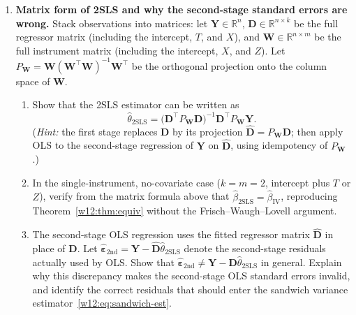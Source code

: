 \documentclass[master.tex]{subfiles}
\begin{document}
\begin{enumerate}
\item \textbf{Matrix form of 2SLS and why the second-stage standard
  errors are wrong.}
  Stack observations into matrices: let $\mathbf{Y} \in \mathbb{R}^n$,
  $\mathbf{D} \in \mathbb{R}^{n \times k}$ be the full regressor
  matrix (including the intercept, $T$, and $X$), and
  $\mathbf{W} \in \mathbb{R}^{n \times m}$ be the full instrument
  matrix (including the intercept, $X$, and $Z$).  Let
  $P_{\mathbf{W}} = \mathbf{W}(\mathbf{W}^\top\mathbf{W})^{-1}\mathbf{W}^\top$
  be the orthogonal projection onto the column space of $\mathbf{W}$.
  \begin{enumerate}
    \item Show that the 2SLS estimator can be written as
      \[
        \hat\theta_{\mathrm{2SLS}}
        = \bigl(\mathbf{D}^\top P_{\mathbf{W}}\mathbf{D}\bigr)^{-1}
          \mathbf{D}^\top P_{\mathbf{W}}\mathbf{Y}.
      \]
      (\emph{Hint:} the first stage replaces $\mathbf{D}$ by its
      projection $\hat{\mathbf{D}} = P_{\mathbf{W}}\mathbf{D}$; then
      apply OLS to the second-stage regression of $\mathbf{Y}$ on
      $\hat{\mathbf{D}}$, using idempotency of $P_{\mathbf{W}}$.)
    \item In the single-instrument, no-covariate case ($k = m = 2$,
      intercept plus $T$ or $Z$), verify from the matrix formula
      above that $\hat\beta_{\mathrm{2SLS}} = \hat\beta_{\mathrm{IV}}$,
      reproducing Theorem~\ref{w12:thm:equiv} without the
      Frisch--Waugh--Lovell argument.
    \item The second-stage OLS regression uses the fitted regressor
      matrix $\hat{\mathbf{D}}$ in place of $\mathbf{D}$.  Let
      $\hat{\boldsymbol{\varepsilon}}_{\mathrm{2nd}}
      = \mathbf{Y} - \hat{\mathbf{D}}\hat\theta_{\mathrm{2SLS}}$
      denote the second-stage residuals actually used by OLS.  Show
      that $\hat{\boldsymbol{\varepsilon}}_{\mathrm{2nd}}
      \neq \mathbf{Y} - \mathbf{D}\hat\theta_{\mathrm{2SLS}}$
      in general.  Explain why this discrepancy makes the
      second-stage OLS standard errors invalid, and identify the
      correct residuals that should enter the sandwich variance
      estimator~\eqref{w12:eq:sandwich-est}.
  \end{enumerate}


\end{enumerate}
\end{document}
